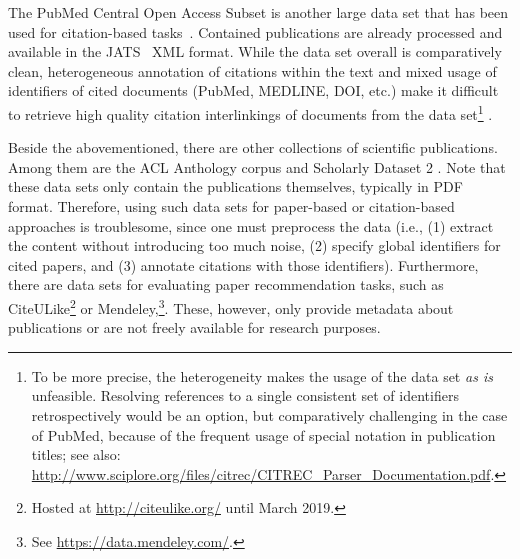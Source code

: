 The PubMed Central Open Access Subset is another large data set that has been used for citation-based tasks~\cite{Gipp2015,Duma2016,Galke2018}. Contained publications are already processed and available in the JATS~\cite{Huh2014} XML format. While the data set overall is comparatively clean, heterogeneous annotation of citations within the text and mixed usage of identifiers of cited documents (PubMed, MEDLINE, DOI, etc.) make it difficult to retrieve high quality citation interlinkings of documents from the data set\footnote{To be more precise, the heterogeneity makes the usage of the data set \emph{as is} unfeasible. Resolving references to a single consistent set of identifiers retrospectively would be an option, but comparatively challenging in the case of PubMed, because of the frequent usage of special notation in publication titles; see also: \url{http://www.sciplore.org/files/citrec/CITREC_Parser_Documentation.pdf}.} \cite{Gipp2015}.

Beside the abovementioned, there are other collections of scientific publications. Among them are the ACL Anthology corpus \cite{Bird2008ACLARC} and Scholarly Dataset 2 \cite{Sugiyama2015}.
Note that these data sets only contain the publications themselves, typically in PDF format. Therefore, using such data sets for paper-based or citation-based approaches is troublesome, since one must preprocess the data (i.e., (1) extract the content without introducing too much noise, (2) specify global identifiers for cited papers, and (3) annotate citations with those identifiers).
Furthermore, there are data sets for evaluating paper recommendation tasks, such as CiteULike\footnote{Hosted at \url{http://citeulike.org/} until March 2019.} or Mendeley,\footnote{See \url{https://data.mendeley.com/}.}. These, however, only provide metadata about publications or are not freely available for research purposes.

